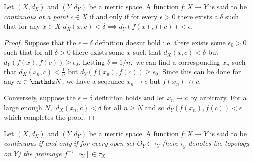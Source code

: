 \begin{prop}
\label{prop:equivalentContinuity}Let $\left(X,d_{X}\right)$ and
$\left(Y,d_{Y}\right)$ be a metric space. A function $f:X\to Y$
is said to be \emph{continuous at a point} $c\in X$ if and only if
for every $\epsilon>0$ there exists a $\delta$ such that for any
$x\in X$ $d_{X}\left(x,c\right)<\delta\implies d_{Y}\left(f\left(x\right),f\left(c\right)\right)<\epsilon$.
\end{prop}

\begin{proof}
Suppose that the $\epsilon-\delta$ definition doesnt hold i.e. there
exists some $\epsilon_{0}>0$ such that for all $\delta>0$ there
exists some $x$ such that $d_{X}\left(x,c\right)<\delta$ but $d_{Y}\left(f\left(x\right),f\left(c\right)\right)\geq\epsilon_{0}.$
Letting $\delta=1/n,$ we can find a corresponding $x_{n}$ such that
$d_{X}\left(x_{n},c\right)<\frac{1}{n}$ but $d_{Y}\left(f\left(x_{n}\right),f\left(c\right)\right)\geq\epsilon_{0}$.
Since this can be done for any $n\in\N$, we have a seqeunce $x_{n}\to c$
but $f\left(x_{n}\right)\not\to c$.

Conversely, suppose the $\epsilon-\delta$ definition holds and let
$x_{n}\to c$ by arbitrary. For a large enough $N,$ $d_{X}\left(x_{n},c\right)<\delta$
for all $n\geq N$ and so $d_{Y}\left(f\left(x_{n}\right),f\left(c\right)\right)<\epsilon$
which completes the proof.
\end{proof}
\begin{prop}
\label{prop:openPreImageMetric}Let $\left(X,d_{X}\right)$ and $\left(Y,d_{Y}\right)$
be a metric space. A function $f:X\to Y$ is said to be \emph{continuous
if and only if for every open set $O_{Y}\in\tau_{Y}$ (here $\tau_{y}$
denotes the topology on $Y$) the preimage $f^{-1}\left[o_{Y}\right]\in\tau_{X}$.}
\end{prop}

